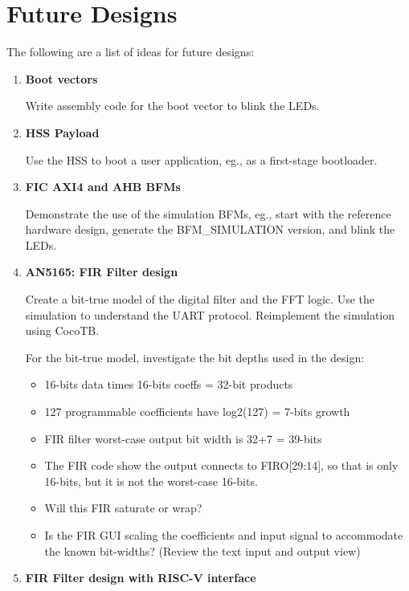 \section{Future Designs}
\label{sec:future}

The following are a list of ideas for future designs:
%
\begin{enumerate}
\item \textbf{Boot vectors}

Write assembly code for the boot vector to blink the LEDs.

\item \textbf{HSS Payload}

Use the HSS to boot a user application, eg., as a first-stage bootloader.

\item \textbf{FIC AXI4 and AHB BFMs}

Demonstrate the use of the simulation BFMs, eg., start with the reference
hardware design, generate the BFM\_SIMULATION version, and blink the LEDs.

\item \textbf{AN5165: FIR Filter design}

Create a bit-true model of the digital filter and the FFT logic.
Use the simulation to understand the UART protocol.
Reimplement the simulation using CocoTB.

For the bit-true model, investigate the bit depths used in the design:
%
\begin{itemize}
\item 16-bits data times 16-bits coeffs = 32-bit products
\item 127 programmable coefficients have log2(127) = 7-bits growth
\item FIR filter worst-case output bit width is 32+7 = 39-bits
\item The FIR code show the output connects to FIRO[29:14], so that is
only 16-bits, but it is not the worst-case 16-bits.
\item Will this FIR saturate or wrap?
\item Is the FIR GUI scaling the coefficients and input signal to
accommodate the known bit-widths? (Review the text input and output view)
\end{itemize}

\item \textbf{FIR Filter design with RISC-V interface}


\end{enumerate}
